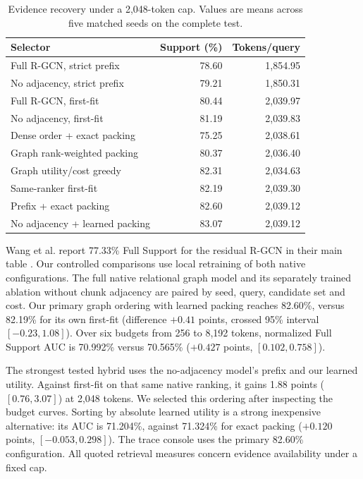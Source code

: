 \documentclass[conference]{IEEEtran}
\begin{document}
\begin{table}[t]
\caption{Evidence recovery under a 2,048-token cap. Values are means across five matched seeds on the complete test.}
\centering\small
\begin{tabular}{lrr}\toprule
Selector & Support (\%) & Tokens/query\\\midrule
Full R-GCN, strict prefix & 78.60 & 1,854.95\\
No adjacency, strict prefix & 79.21 & 1,850.31\\
Full R-GCN, first-fit & 80.44 & 2,039.97\\
No adjacency, first-fit & 81.19 & 2,039.83\\\midrule
Dense order + exact packing & 75.25 & 2,038.61\\
Graph rank-weighted packing & 80.37 & 2,036.40\\
Graph utility/cost greedy & 82.31 & 2,034.63\\
Same-ranker first-fit & 82.19 & 2,039.30\\
Prefix + exact packing & 82.60 & 2,039.12\\
No adjacency + learned packing & 83.07 & 2,039.12\\
\bottomrule\end{tabular}
\label{tab:retrieval}
\end{table}

Wang et al. report 77.33\% Full Support for the residual R-GCN in their main table \cite{wang}. Our controlled comparisons use local retraining of both native configurations. The full native relational graph model and its separately trained ablation without chunk adjacency are paired by seed, query, candidate set and cost. Our primary graph ordering with learned packing reaches 82.60\%, versus 82.19\% for its own first-fit (difference $+0.41$ points, crossed 95\% interval $[-0.23,1.08]$). Over six budgets from 256 to 8,192 tokens, normalized Full Support AUC is 70.992\% versus 70.565\% ($+0.427$ points, $[0.102,0.758]$).

The strongest tested hybrid uses the no-adjacency model's prefix and our learned utility. Against first-fit on that same native ranking, it gains 1.88 points ($[0.76,3.07]$) at 2,048 tokens. We selected this ordering after inspecting the budget curves. Sorting by absolute learned utility is a strong inexpensive alternative: its AUC is 71.204\%, against 71.324\% for exact packing ($+0.120$ points, $[-0.053,0.298]$). The trace console uses the primary 82.60\% configuration. All quoted retrieval measures concern evidence availability under a fixed cap.
\end{document}
